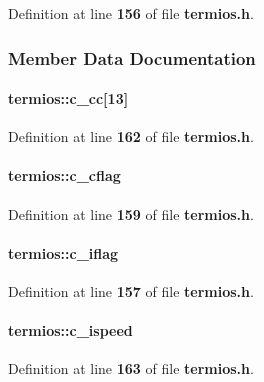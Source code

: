 Definition at line {\bf 156} of file {\bf termios.\+h}.



\subsubsection{Member Data Documentation}
\paragraph[{c\+\_\+cc}]{ termios\+::c\+\_\+cc[13]}\label{structtermios_acba806e3404639a74302dae88ebd4482}


Definition at line {\bf 162} of file {\bf termios.\+h}.

\paragraph[{c\+\_\+cflag}]{ termios\+::c\+\_\+cflag}\label{structtermios_a5d42b95faa4745c3bea53652d2812162}


Definition at line {\bf 159} of file {\bf termios.\+h}.

\paragraph[{c\+\_\+iflag}]{ termios\+::c\+\_\+iflag}\label{structtermios_a85b6c86d2a3db45a3829488190e357e4}


Definition at line {\bf 157} of file {\bf termios.\+h}.

\paragraph[{c\+\_\+ispeed}]{ termios\+::c\+\_\+ispeed}\label{structtermios_a02ae972cbc9fb2cf4a1aa6a6751a421a}


Definition at line {\bf 163} of file {\bf termios.\+h}.

